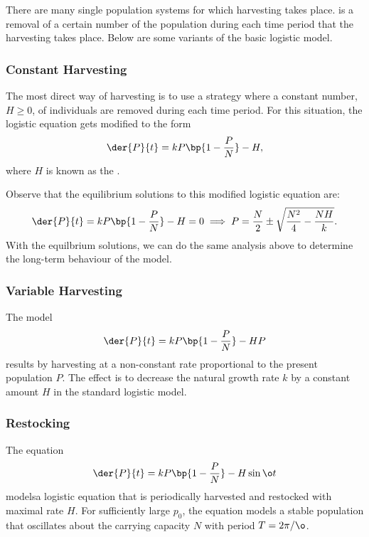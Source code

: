 There are many single population systems for which harvesting takes place.  is a removal of a certain number of the population during each time period that the harvesting takes place. Below are some variants of the basic logistic model.

\subsubsection{Constant Harvesting}

The most direct way of harvesting is to use a strategy where a constant number, $H \geq 0$, of individuals are removed during each time period. For this situation, the logistic equation gets modified to the form \[\der{P}{t} = kP\bp{1 - \frac{P}{N}} - H,\] where $H$ is known as the .

Observe that the equilibrium solutions to this modified logistic equation are: \[\der{P}{t} = kP\bp{1 - \frac{P}{N}} - H = 0 \implies P = \frac{N}{2} \pm \sqrt{\frac{N^2}{4} - \frac{NH}{k}}.\] With the equilbrium solutions, we can do the same analysis above to determine the long-term behaviour of the model.

\subsubsection{Variable Harvesting}

The model \[\der{P}{t} = kP \bp{1 - \frac{P}{N}} - HP\] results by harvesting at a non-constant rate proportional to the present population $P$. The effect is to decrease the natural growth rate $k$ by a constant amount $H$ in the standard logistic model.

\subsubsection{Restocking}

The equation \[\der{P}{t} = kP \bp{1 - \frac{P}{N}} - H \sin{\o t}\] modelsa logistic equation that is periodically harvested and restocked with maximal rate $H$. For sufficiently large $p_0$, the equation models a stable population that oscillates about the carrying capacity $N$ with period $T = 2\pi / \o$.